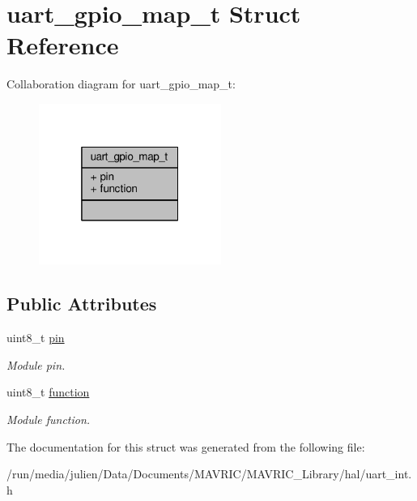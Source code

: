 \hypertarget{structuart__gpio__map__t}{\section{uart\+\_\+gpio\+\_\+map\+\_\+t Struct Reference}
\label{structuart__gpio__map__t}
}


Collaboration diagram for uart\+\_\+gpio\+\_\+map\+\_\+t\+:
\nopagebreak
\begin{figure}[H]
\begin{center}
\leavevmode
\includegraphics[width=169pt]{structuart__gpio__map__t__coll__graph}
\end{center}
\end{figure}
\subsection*{Public Attributes}
\begin{DoxyCompactItemize}
\item 
\hypertarget{structuart__gpio__map__t_ab578ac3f8ed618b425b4725cdc78b518}{uint8\+\_\+t \hyperlink{structuart__gpio__map__t_ab578ac3f8ed618b425b4725cdc78b518}{pin}}\label{structuart__gpio__map__t_ab578ac3f8ed618b425b4725cdc78b518}

\begin{DoxyCompactList}\small\item\em Module pin. \end{DoxyCompactList}\item 
\hypertarget{structuart__gpio__map__t_a76608f777dfe5389d1c20ba5cff4c7f1}{uint8\+\_\+t \hyperlink{structuart__gpio__map__t_a76608f777dfe5389d1c20ba5cff4c7f1}{function}}\label{structuart__gpio__map__t_a76608f777dfe5389d1c20ba5cff4c7f1}

\begin{DoxyCompactList}\small\item\em Module function. \end{DoxyCompactList}\end{DoxyCompactItemize}


The documentation for this struct was generated from the following file\+:\begin{DoxyCompactItemize}
\item 
/run/media/julien/\+Data/\+Documents/\+M\+A\+V\+R\+I\+C/\+M\+A\+V\+R\+I\+C\+\_\+\+Library/hal/uart\+\_\+int.\+h\end{DoxyCompactItemize}
